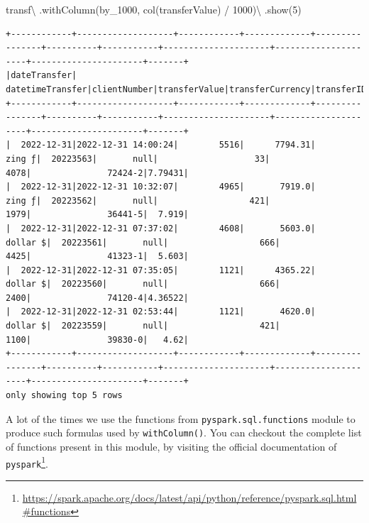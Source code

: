 \documentclass[
  11pt,
  letterpaper,
  DIV=11,
  numbers=noendperiod]{scrreprt}
\newenvironment{Shaded}{\begin{snugshade}}{\end{snugshade}}
\newcommand{\DecValTok}[1]{\textcolor[rgb]{0.68,0.00,0.00}{#1}}
\newcommand{\NormalTok}[1]{\textcolor[rgb]{0.00,0.23,0.31}{#1}}
\newcommand{\OperatorTok}[1]{\textcolor[rgb]{0.37,0.37,0.37}{#1}}
\newcommand{\StringTok}[1]{\textcolor[rgb]{0.13,0.47,0.30}{#1}}
\begin{document}
\begin{Shaded}
\begin{Highlighting}[]
\NormalTok{transf}\OperatorTok{\textbackslash{}}
\NormalTok{  .withColumn(}\StringTok{\textquotesingle{}by\_1000\textquotesingle{}}\NormalTok{, col(}\StringTok{\textquotesingle{}transferValue\textquotesingle{}}\NormalTok{) }\OperatorTok{/} \DecValTok{1000}\NormalTok{)}\OperatorTok{\textbackslash{}}
\NormalTok{  .show(}\DecValTok{5}\NormalTok{)}
\end{Highlighting}
\end{Shaded}

\begin{verbatim}
+------------+-------------------+------------+-------------+----------------+----------+-----------+---------------------+---------------------+----------------------+-------+
|dateTransfer|   datetimeTransfer|clientNumber|transferValue|transferCurrency|transferID|transferLog|destinationBankNumber|destinationBankBranch|destinationBankAccount|by_1000|
+------------+-------------------+------------+-------------+----------------+----------+-----------+---------------------+---------------------+----------------------+-------+
|  2022-12-31|2022-12-31 14:00:24|        5516|      7794.31|          zing ƒ|  20223563|       null|                   33|                 4078|               72424-2|7.79431|
|  2022-12-31|2022-12-31 10:32:07|        4965|       7919.0|          zing ƒ|  20223562|       null|                  421|                 1979|               36441-5|  7.919|
|  2022-12-31|2022-12-31 07:37:02|        4608|       5603.0|        dollar $|  20223561|       null|                  666|                 4425|               41323-1|  5.603|
|  2022-12-31|2022-12-31 07:35:05|        1121|      4365.22|        dollar $|  20223560|       null|                  666|                 2400|               74120-4|4.36522|
|  2022-12-31|2022-12-31 02:53:44|        1121|       4620.0|        dollar $|  20223559|       null|                  421|                 1100|               39830-0|   4.62|
+------------+-------------------+------------+-------------+----------------+----------+-----------+---------------------+---------------------+----------------------+-------+
only showing top 5 rows
\end{verbatim}

A lot of the times we use the functions from
\texttt{pyspark.sql.functions} module to produce such formulas used by
\texttt{withColumn()}. You can checkout the complete list of functions
present in this module, by visiting the official documentation of
\texttt{pyspark}\footnote{\url{https://spark.apache.org/docs/latest/api/python/reference/pyspark.sql.html\#functions}}.
\end{document}
